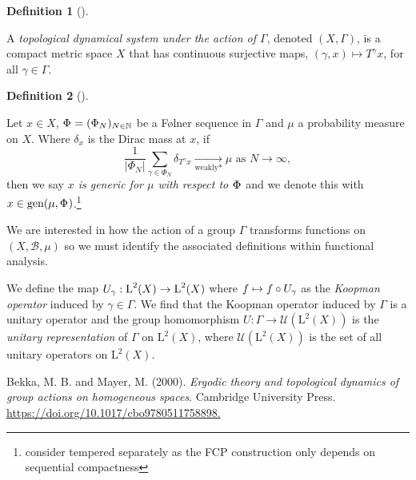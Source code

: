 \documentclass[
  british,
]{article}
\newlength{\cslhangindent}
\newenvironment{CSLReferences}[2] %
 {\begin{list}{}{%
  \setlength{\itemindent}{0pt}
  \setlength{\leftmargin}{0pt}
  \setlength{\parsep}{0pt}
  \ifodd #1
   \setlength{\leftmargin}{\cslhangindent}
   \setlength{\itemindent}{-1\cslhangindent}
  \fi
  \setlength{\itemsep}{#2\baselineskip}}}
 {\end{list}}
\theoremstyle{definition}
\newtheorem{definition}{Definition}[section]
\theoremstyle{remark}
\newcommand{\CountingMeasure}[1]{{\left|#1\right|}}
\newcommand{\Folner}[1][\vphantom{}]{{\Phi}_{#1}}
\newcommand{\Group}{{\Gamma}}
\newcommand{\GroupAction}[2]{T^{#1}{#2}}
\newcommand{\GroupElement}{{\gamma}}
\newcommand{\Measure}{{\mu}}
\newcommand{\SigmaAlgebra}[1]{{\mathscr{#1}}}
\begin{document}
\begin{definition}[]\protect\hypertarget{def-topologicalDynamicalSystem}{}\label{def-topologicalDynamicalSystem}

A \emph{topological dynamical system under the action of \(\Group\)},
denoted \((X,\Group)\), is a compact metric space \(X\) that has
continuous surjective maps,
\((\GroupElement,x)\mapsto \GroupAction{\GroupElement}{x}\), for all
\(\GroupElement\in\Group\).

\end{definition}

\begin{definition}[]\protect\hypertarget{def-generic}{}\label{def-generic}

Let \(x\in X\), \(\Folner=(\Folner[N])_{N\in\mathbb{N}}\) be a Følner
sequence in \(\Gamma\) and \(\Measure\) a probability measure on \(X\).
Where \(\delta_x\) is the Dirac mass at \(x\), if
\[\frac{1}{\CountingMeasure{\Folner[N]}}\sum_{\GroupElement\in\Folner[N]}\delta_{\GroupAction{\GroupElement}{x}}\underset{\text{weakly*}}{\longrightarrow} \Measure \text{ as }N\rightarrow\infty, \]
then we say \emph{\(x\) is generic for \(\Measure\) with respect to
\(\Folner\)} and we denote this with
\(x\in\text{gen}(\Measure,\Folner)\).\footnote{consider tempered
  separately as the FCP construction only depends on sequential
  compactness}

\end{definition}

We are interested in how the action of a group \(\Group\) transforms
functions on \((X,\SigmaAlgebra{B},\Measure)\) so we must identify the
associated definitions within functional analysis.

We define the map
\(\KoopmanOperator[\GroupElement][]:\text{L}^2(X)\rightarrow\text{L}^2(X)\)
where \(f\mapsto f\circ \KoopmanOperator[\GroupElement][]\) as the
\emph{Koopman operator} induced by \(\GroupElement\in\Group\). We find
that the Koopman operator induced by \(\Group\) is a unitary operator
and the group homomorphism
\(U:\Group\rightarrow\mathscr{U}(\text{L}^2(X))\) is the \emph{unitary
representation} of \(\Group\) on \(\text{L}^2(X)\), where
\(\mathscr{U}(\text{L}^2(X))\) is the set of all unitary operators on
\(\text{L}^2(X)\).

\protect{}\label{refs}
\begin{CSLReferences}{1}{0}
Bekka, M. B. and Mayer, M. (2000). \emph{Ergodic theory and topological
dynamics of group actions on homogeneous spaces}. Cambridge University
Press.
\href{https://doi.org/10.1017/cbo9780511758898}{https://doi.org/10.1017/cbo9780511758898.}

\end{CSLReferences}
\end{document}

